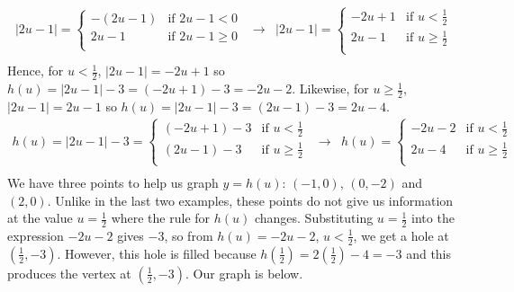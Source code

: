 \documentclass{ximera}
\begin{document}
\begin{example}
\begin{enumerate}
\[\begin{array}{ccc}
 |2u - 1|  = \begin{cases} 
      -(2u - 1) &  \text{if $2u - 1  < 0$} \\
     2u - 1 & \text{if $2u - 1 \geq 0$} \\
   \end{cases}
   
 &
 
 \longrightarrow
 
 &
 
 |2u - 1|  =   \begin{cases} 
     -2u + 1 &  \text{if $u < {\textstyle \frac{1}{2}}$} \\ 
    2u - 1  & \text{if $u \geq {\textstyle \frac{1}{2}}$}\\
   \end{cases} \\ 
   
   \end{array}  \] Hence, for $u <  \frac{1}{2}$, $|2u - 1| = -2u + 1$ so $h(u) = |2u - 1| - 3 = (-2u + 1) - 3 = -2u - 2$.  Likewise, for $u \geq   \frac{1}{2}$, $|2u - 1| = 2u - 1$ so $h(u) = |2u - 1| - 3 = (2u - 1) - 3 = 2u - 4$. \[ \begin{array}{ccc}

h(u)  =   |2u - 1| - 3 =  \begin{cases} 
    (-2u + 1) - 3 & \text{if $u < {\textstyle \frac{1}{2}}$} \\
    (2u - 1) - 3  & \text{if $u \geq {\textstyle \frac{1}{2}}$} \\
   \end{cases} 
   
 &
 
 \longrightarrow
 
 &
 
h(u)  =   \begin{cases} 
    -2u - 2  & \text{if $u < {\textstyle \frac{1}{2}}$} \\
    2u - 4   & \text{if $u \geq {\textstyle \frac{1}{2}}$} \\
   \end{cases} \\ 
   
   \end{array}  \] We have three points to help us graph $y = h(u)$:  $(-1, 0)$, $(0, -2)$ and $(2, 0)$. Unlike in the last two examples, these points do not give us information at the  value $u = \frac{1}{2}$ where the rule for $h(u)$ changes.  Substituting $u = \frac{1}{2}$ into the expression $-2u - 2$ gives $-3$, so from $h(u) = -2u - 2$, $u <  \frac{1}{2}$, we get a hole at $\left(\frac{1}{2}, -3 \right)$.  However, this hole is filled because  $h\left(\frac{1}{2}\right) = 2\left(\frac{1}{2}\right) - 4  = -3$ and this produces the vertex at $\left(\frac{1}{2}, -3 \right)$. Our graph is below.
   

\end{enumerate}
\end{example}
\end{document}
